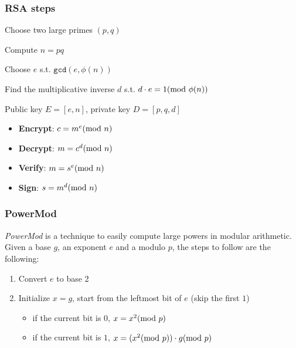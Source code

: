 \paragraph{}



\subsubsection{RSA steps}
\begin{enumerate}
    \item Choose two large primes $(p,q)$
    \item Compute $n=pq$
    \item Choose $e$ s.t. $\texttt{gcd}(e,\phi(n))$
    \item Find the multiplicative inverse $d$ s.t. $d\cdot e=1(\mathrm{mod}\ \phi(n))$
    {\color{teal} \item Public key $E=[e,n]$, private key $D=[p,q,d]$}
    \begin{itemize}
        \item \textbf{Encrypt}: $c=m^e(\mathrm{mod}\ n)$
        \item \textbf{Decrypt}: $m=c^d(\mathrm{mod}\ n)$
        \item \textbf{Verify}: $m=s^e(\mathrm{mod}\ n)$
        \item \textbf{Sign}: $s=m^d(\mathrm{mod}\ n)$
    \end{itemize}
\end{enumerate}

\subsubsection{PowerMod}
\textit{PowerMod} is a technique to easily compute large powers in modular arithmetic. Given a base $g$, an exponent $e$ and a modulo $p$, the steps to follow are the following:
\begin{enumerate}
    \item Convert $e$ to base 2
    \item Initialize $x=g$, start from the leftmost bit of $e$ (skip the first $1$)
    \begin{itemize}
        \item if the current bit is $0$, $x=x^2(\mathrm{mod}\ p)$
        \item if the current bit is $1$, $x=(x^2(\mathrm{mod}\ p))\cdot g (\mathrm{mod}\ p)$
    \end{itemize}
\end{enumerate}

